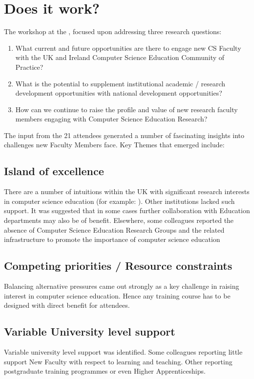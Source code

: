 \documentclass[sigconf]{acmart}
\begin{document}
\section{Does it work?}	
The workshop  at the  , focused upon addressing three research questions:
\begin{enumerate}
\item What current and future opportunities are there to engage new CS Faculty with the UK and Ireland Computer Science Education Community of Practice?
\item What is the potential to supplement institutional academic / research development opportunities with national development opportunities?
\item How can we continue to raise the profile and value of new research faculty members engaging with Computer Science Education Research?
\end{enumerate}
The input from the 21 attendees generated a number of fascinating insights into challenges new Faculty Members face. Key Themes that emerged include:

\subsection{Island of excellence}
There are a number of intuitions within the UK with significant research interests in computer science education (for example: ). Other institutions lacked such support. It was suggested that in some cases further collaboration with Education departments may also be of benefit. Elsewhere, some colleagues reported the absence of Computer Science Education Research Groups and the related infrastructure to promote the importance of computer science education
\subsection{Competing priorities / Resource constraints}
Balancing alternative pressures came out strongly as a key challenge in raising interest in computer science education. Hence any training course has to be designed with direct benefit for attendees. 
\subsection{Variable University level support}
Variable university level support was identified. Some colleagues reporting little support New Faculty with respect to learning and teaching. Other reporting postgraduate training programmes or even Higher Apprenticeships.
\end{document}
